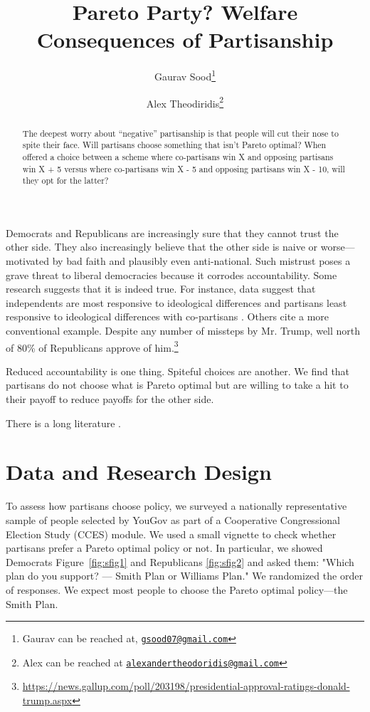 \documentclass[12pt, letterpaper]{article}
\title{Pareto Party? Welfare Consequences of Partisanship}
\author{Gaurav Sood\thanks{Gaurav can be reached at, \href{mailto:gsood07@gmail.com}{\texttt{gsood07@gmail.com}}} \and Alex Theodiridis\thanks{Alex can be reached at \href{alexandertheodoridis@gmail.com}{\texttt{alexandertheodoridis@gmail.com}}}}
\begin{document}
\maketitle
\thispagestyle{empty}

\begin{abstract}

\noindent The deepest worry about ``negative'' partisanship is that people will cut their nose to spite their face. Will partisans choose something that isn't Pareto optimal? When offered a choice between a scheme where co-partisans win X and opposing partisans win X + 5 versus where co-partisans win X - 5 and opposing partisans win X - 10, will they opt for the latter?

\end{abstract}

\newpage


\doublespacing

Democrats and Republicans are increasingly sure that they cannot trust the other side. They also increasingly believe that the other side is naive or worse---motivated by bad faith and plausibly even anti-national. Such mistrust poses a grave threat to liberal democracies because it corrodes accountability. Some research suggests that it is indeed true. For instance, data suggest that independents are most responsive to ideological differences and partisans least responsive to ideological differences with co-partisans \citep{sood2018all}. Others cite a more conventional example. Despite any number of missteps by Mr. Trump, well north of 80\% of Republicans approve of him.\footnote{\href{https://news.gallup.com/poll/203198/presidential-approval-ratings-donald-trump.aspx}{https://news.gallup.com/poll/203198/presidential-approval-ratings-donald-trump.aspx}}

Reduced accountability is one thing. Spiteful choices are another. We find that partisans do not choose what is Pareto optimal but are willing to take a hit to their payoff to reduce payoffs for the other side.

There is a long literature \citep{amira2019group}.

\section{Data and Research Design}

To assess how partisans choose policy, we surveyed a nationally representative sample of people selected by YouGov \citep{rivers2007} as part of a Cooperative Congressional Election Study (CCES) module. We used a small vignette to check whether partisans prefer a Pareto optimal policy or not. In particular, we showed Democrats Figure~\ref{fig:sfig1} and Republicans \ref{fig:sfig2} and asked them: "Which plan do you support? --- Smith Plan or Williams Plan." We randomized the order of responses. We expect most people to choose the Pareto optimal policy---the Smith Plan.
\end{document}
